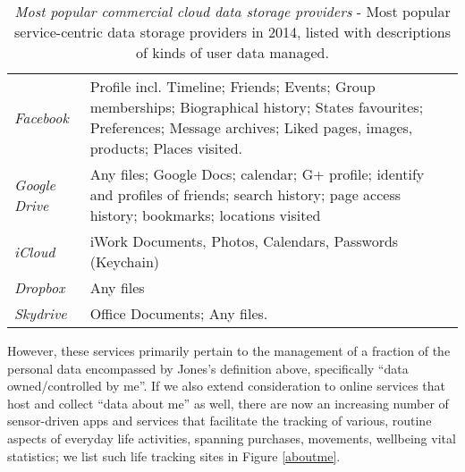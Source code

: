 \documentclass[graybox]{svmult}
\begin{document}
\begin{table}
\begin{tabular}{p{2.2cm} p{9cm}}
\emph{Facebook} & Profile incl. Timeline; Friends; Events; Group memberships; Biographical history; States favourites; Preferences; Message archives; Liked pages, images, products; Places visited. \\

\emph{Google Drive} & Any files; Google Docs; calendar; G+ profile; identify and profiles of friends; search history; page access history; bookmarks; locations visited \\

\emph{iCloud} & iWork Documents, Photos, Calendars, Passwords (Keychain) \\
\emph{Dropbox} & Any files \\

\emph{Skydrive} & Office Documents; Any files. \\

\end{tabular}
\caption{\emph{Most popular commercial cloud data storage providers} - Most popular service-centric data storage providers in 2014, listed with descriptions of kinds of user data managed.}
\label{fig:cloudstorage}
\end{table}

However, these services primarily pertain to the management of a fraction of the personal data encompassed by Jones's definition above, specifically ``data owned/controlled by me''.  If we also extend consideration to online services that host and collect ``data about me'' as well, there are now an increasing number of sensor-driven apps and services that facilitate the tracking of various, routine aspects of everyday life activities, spanning purchases, movements, wellbeing vital statistics; we list such life tracking sites in Figure \ref{aboutme}.
\end{document}
